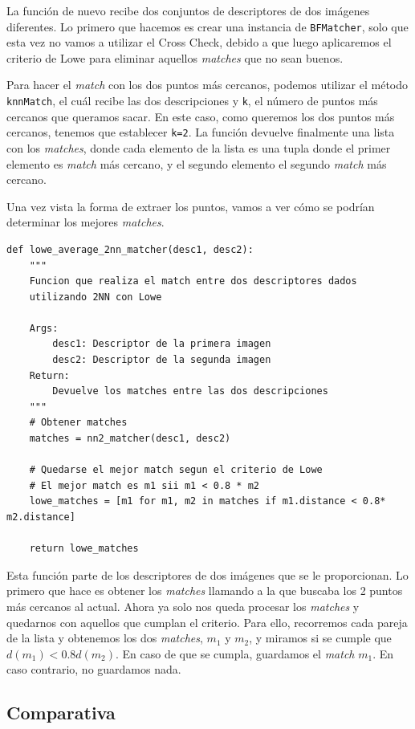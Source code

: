 \documentclass[11pt,a4paper]{article}
\begin{document}
La función de nuevo recibe dos conjuntos de descriptores de dos imágenes diferentes.
Lo primero que hacemos es crear una instancia de \texttt{BFMatcher}, solo que esta
vez no vamos a utilizar el Cross Check, debido a que luego aplicaremos el criterio
de Lowe para eliminar aquellos \textit{matches} que no sean buenos.

Para hacer el \textit{match} con los dos puntos más cercanos, podemos utilizar el método
\texttt{knnMatch}, el cuál recibe las dos descripciones y \texttt{k}, el número de puntos
más cercanos que queramos sacar. En este caso, como queremos los dos puntos más cercanos,
tenemos que establecer \texttt{k=2}. La función devuelve finalmente una lista con los
\textit{matches}, donde cada elemento de la lista es una tupla donde el primer
elemento es \textit{match} más cercano, y el segundo elemento el segundo \textit{match}
más cercano.

Una vez vista la forma de extraer los puntos, vamos a ver cómo se podrían determinar los
mejores \textit{matches}.

\begin{lstlisting}
def lowe_average_2nn_matcher(desc1, desc2):
    """
    Funcion que realiza el match entre dos descriptores dados
    utilizando 2NN con Lowe

    Args:
        desc1: Descriptor de la primera imagen
        desc2: Descriptor de la segunda imagen
    Return:
        Devuelve los matches entre las dos descripciones
    """
    # Obtener matches
    matches = nn2_matcher(desc1, desc2)

    # Quedarse el mejor match segun el criterio de Lowe
    # El mejor match es m1 sii m1 < 0.8 * m2
    lowe_matches = [m1 for m1, m2 in matches if m1.distance < 0.8* m2.distance]

    return lowe_matches
\end{lstlisting}

Esta función parte de los descriptores de dos imágenes que se le proporcionan. Lo primero
que hace es obtener los \textit{matches} llamando a la que buscaba los 2 puntos más
cercanos al actual. Ahora ya solo nos queda procesar los \textit{matches} y quedarnos
con aquellos que cumplan el criterio. Para ello, recorremos cada pareja de la lista
y obtenemos los dos \textit{matches}, $m_1$ y $m_2$, y miramos si se cumple que
$d(m_1) < 0.8d(m_2)$. En caso de que se cumpla, guardamos el \textit{match}
$m_1$. En caso contrario, no guardamos nada.

\subsection{Comparativa}
\end{document}
